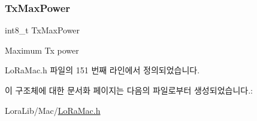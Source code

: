 \mbox{\label{structs_band_a1b9d27384fedab3a94167b8e9bf9b432}} 
\subsubsection{\texorpdfstring{Tx\+Max\+Power}{TxMaxPower}}
{\footnotesize\ttfamily int8\+\_\+t Tx\+Max\+Power}

Maximum Tx power 

Lo\+Ra\+Mac.\+h 파일의 151 번째 라인에서 정의되었습니다.



이 구조체에 대한 문서화 페이지는 다음의 파일로부터 생성되었습니다.\+:\begin{DoxyCompactItemize}
\item 
Lora\+Lib/\+Mac/\mbox{\hyperlink{_lo_ra_mac_8h}{Lo\+Ra\+Mac.\+h}}\end{DoxyCompactItemize}
